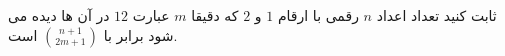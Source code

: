 \exercise
ثابت کنید تعداد اعداد
$n$
رقمی با ارقام
$1$
و
$2$
که دقیقا
$m$
عبارت
$12$
در آن ها دیده می شود برابر با
$\binom{n+1}{2m+1}$
است.
